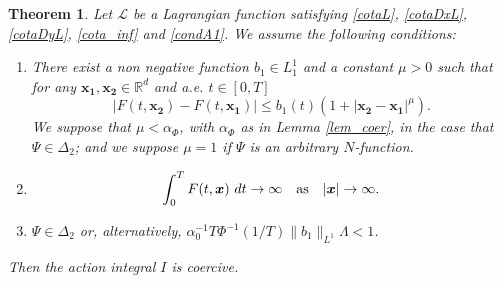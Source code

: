 \documentclass[twoside]{article}
\newtheorem{thm}{Theorem}[section]
\theoremstyle{remark}
\renewcommand{\b}[1]{\boldsymbol{#1}}
\newcommand{\rr}{\mathbb{R}}
\renewcommand{\leq}{\leqslant}
\begin{document}
\begin{thm}\label{coercitividad1}
Let  $\mathcal{L}$ be a Lagrangian function satisfying \eqref{cotaL}, \eqref{cotaDxL}, \eqref{cotaDyL}, \eqref{cota_inf} and \eqref{condA1}. We assume the following conditions:
\begin{enumerate}
\item There exist a non negative function  $b_1 \in L^1_1$ and a constant $\mu>0$  such that for any $\b{x_1},\b{x_2}\in\rr^d$ and a.e. $t\in [0,T]$
\begin{equation}\label{holder_cont}
  \left| F(t,\b{x_2})- F(t,\b{x_1}) \right|\leq b_1(t)(1+|\b{x_2}-\b{x_1}|^{\mu}).
\end{equation}
We suppose that $\mu< \alpha_{\Phi}$,  with $\alpha_{\Phi}$ as in Lemma \ref{lem_coer}, in the case that $\Psi\in\Delta_2$; and we suppose $\mu=1$  if $\Psi$ is an  arbitrary $N$-function. 
\item
\begin{equation}\label{propiedad1coercividad}
\int_{0}^{T}F(t,\b{x})\ dt \rightarrow \infty \quad \hbox{as} \quad |\b{x}|\rightarrow \infty.
\end{equation}
\item\label{hipot_coer}  $\Psi\in\Delta_2$ or, alternatively, 
$\alpha_0^{-1}T\Phi^{-1}\left(1/T\right)\|b_1\|_{L^1}\Lambda<1$.
\end{enumerate}
Then  the action integral $I$ is coercive.
\end{thm}
\end{document}
